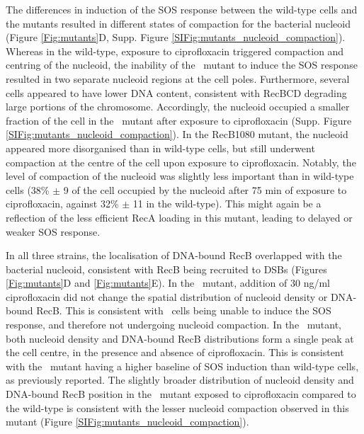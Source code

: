 The differences in induction of the SOS response between the wild-type cells and the mutants resulted in different states of compaction for the bacterial nucleoid (Figure \ref{Fig:mutants}D, Supp. Figure \ref{SIFig:mutants_nucleoid_compaction}). Whereas in the wild-type, exposure to ciprofloxacin triggered compaction and centring of the nucleoid, the inability of the \dreca\ mutant to induce the SOS response resulted in two separate nucleoid regions at the cell poles. Furthermore, several cells appeared to have lower DNA content, consistent with RecBCD degrading large portions of the chromosome. Accordingly, the nucleoid occupied a smaller fraction of the cell in the \dreca\ mutant after exposure to ciprofloxacin (Supp. Figure \ref{SIFig:mutants_nucleoid_compaction}). In the RecB1080 mutant, the nucleoid appeared more disorganised than in wild-type cells, but still underwent compaction at the centre of the cell upon exposure to ciprofloxacin. Notably, the level of compaction of the nucleoid was slightly less important than in wild-type cells (38\% $\pm$ 9 of the cell occupied by the nucleoid after 75 min of exposure to ciprofloxacin, against 32\% $\pm$ 11 in the wild-type). This might again be a reflection of the less efficient RecA loading in this mutant, leading to delayed or weaker SOS response.

In all three strains, the localisation of DNA-bound RecB overlapped with the bacterial nucleoid, consistent with RecB being recruited to DSBs (Figures \ref{Fig:mutants}D and \ref{Fig:mutants}E). In the \dreca\ mutant, addition of 30 ng/ml ciprofloxacin did not change the spatial distribution of nucleoid density or DNA-bound RecB. This is consistent with \dreca\ cells being unable to induce the SOS response, and therefore not undergoing nucleoid compaction. In the \teneighty\ mutant, both nucleoid density and DNA-bound RecB distributions form a single peak at the cell centre, in the presence and absence of ciprofloxacin. This is consistent with the \teneighty\ mutant having a higher baseline of SOS induction than wild-type cells, as previously reported.\cite{Lepore2023} The slightly broader distribution of nucleoid density and DNA-bound RecB position in the \teneighty\ mutant exposed to ciprofloxacin compared to the wild-type is consistent with the lesser nucleoid compaction observed in this mutant (Figure \ref{SIFig:mutants_nucleoid_compaction}).

